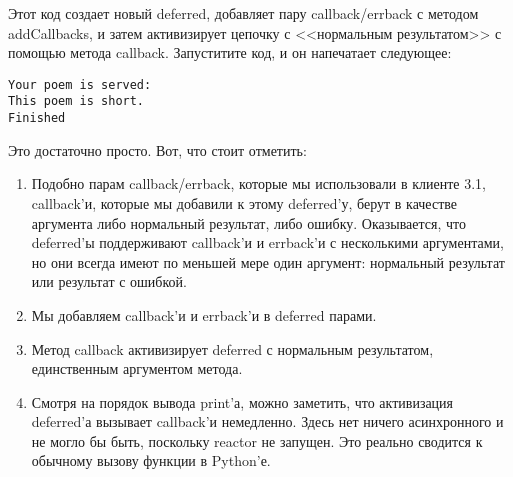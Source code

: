 Этот код создает новый deferred, добавляет пару callback/errback с 
методом addCallbacks, и затем активизирует цепочку с <<нормальным результатом>> 
с помощью метода callback. Запуститите код, и он напечатает следующее:

 \begin{verbatim}
Your poem is served:
This poem is short.
Finished
\end{verbatim} 

Это достаточно просто. Вот, что стоит отметить:

\begin{enumerate}
\item Подобно парам callback/errback, которые мы использовали в 
клиенте 3.1, callback'и, которые мы добавили к этому deferred'у, 
берут в качестве аргумента либо нормальный результат, либо ошибку. 
Оказывается, что deferred'ы поддерживают callback'и и errback'и 
с несколькими аргументами, но они всегда имеют по меньшей мере 
один аргумент: нормальный результат или результат с ошибкой.

\item Мы добавляем callback'и и errback'и в deferred парами.

\item Метод callback активизирует deferred с нормальным результатом, 
единственным аргументом метода.

\item Смотря на порядок вывода print'а, можно заметить, 
что активизация deferred'а вызывает callback'и немедленно. 
Здесь нет ничего асинхронного и не могло бы быть, поскольку 
reactor не запущен. Это реально сводится к обычному вызову 
функции в Python'е.

\end{enumerate}

